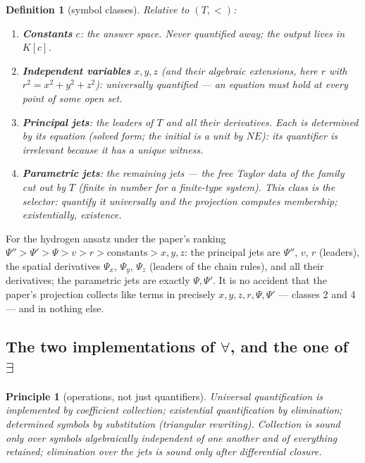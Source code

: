 \documentclass[11pt]{article}
\newcommand{\Psib}{\Psi}
\newtheorem{definition}{Definition}
\newtheorem{principle}{Principle}
\begin{document}
\begin{definition}[symbol classes]
\label{def:classes}
Relative to $(T, <)$:
\begin{enumerate}
\item \textbf{Constants} $c$: the answer space. Never quantified away; the
  output lives in $K[c]$.
\item \textbf{Independent variables} $x,y,z$ (and their algebraic extensions,
  here $r$ with $r^2 = x^2+y^2+z^2$): universally quantified --- an equation
  must hold at every point of some open set.
\item \textbf{Principal jets}: the leaders of $T$ and all their derivatives.
  Each is \emph{determined} by its equation (solved form; the initial is a
  unit by $NE$): its quantifier is irrelevant because it has a unique witness.
\item \textbf{Parametric jets}: the remaining jets --- the free Taylor data of
  the family cut out by $T$ (finite in number for a finite-type system).
  \emph{This class is the selector}: quantify it universally and the
  projection computes membership; existentially, existence.
\end{enumerate}
\end{definition}

For the hydrogen ansatz under the paper's ranking
$\Psib'' > \Psib' > \Psib > v > r > \text{constants} > x,y,z$: the principal
jets are $\Psib''$, $v$, $r$ (leaders), the spatial derivatives $\Psib_x$,
$\Psib_y$, $\Psib_z$ (leaders of the chain rules), and all their derivatives;
the parametric jets are exactly $\Psib, \Psib'$. It is no accident that the
paper's projection collects like terms in precisely
$x,y,z,r,\Psib,\Psib'$ --- classes 2 and 4 --- and in nothing else.

\subsection{The two implementations of $\forall$, and the one of $\exists$}

\begin{principle}[operations, not just quantifiers]
\label{prin:ops}
Universal quantification is implemented by \emph{coefficient collection};
existential quantification by \emph{elimination}; determined symbols by
\emph{substitution} (triangular rewriting). Collection is sound only over
symbols algebraically independent of one another and of everything retained;
elimination over the jets is sound only after differential closure.
\end{principle}
\end{document}

